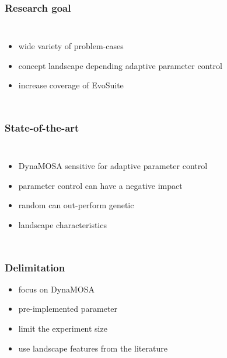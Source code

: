 \begin{frame}
	\frametitle{Research goal}
	
	\begin{columns}[c]
		
		\column{\textwidth}
		\begin{itemize}
			\item wide variety of problem-cases
			\item concept landscape depending adaptive parameter control
			\item increase coverage of EvoSuite
		\end{itemize}
		
	\end{columns}
	
\end{frame}

\begin{frame}
	\frametitle{State-of-the-art}
	
	\begin{columns}[c]
		
		\column{\textwidth}
		\begin{itemize}
			\item DynaMOSA sensitive for adaptive parameter control \cite{Wetzler.2020}
			\item parameter control can have a negative impact \cite{Paterson.2015}
			\item random can out-perform genetic \cite{Shamshiri.2015}
			\item landscape characteristics \cite{Albunian.2020}
		\end{itemize}
		
	\end{columns}
	
\end{frame}

\begin{frame}
	\frametitle{Delimitation}
	
	\begin{itemize}
		\item focus on DynaMOSA
		\item pre-implemented parameter
		\item limit the experiment size
		\item use landscape features from the literature
	\end{itemize}
	
\end{frame}


